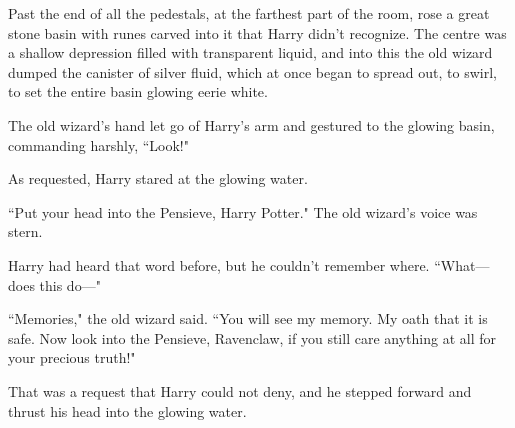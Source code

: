 Past the end of all the pedestals, at the farthest part of the room, rose a great stone basin with runes carved into it that Harry didn't recognize. The centre was a shallow depression filled with transparent liquid, and into this the old wizard dumped the canister of silver fluid, which at once began to spread out, to swirl, to set the entire basin glowing eerie white.

The old wizard's hand let go of Harry's arm and gestured to the glowing basin, commanding harshly, ``Look!"

As requested, Harry stared at the glowing water.

``Put your head into the Pensieve, Harry Potter." The old wizard's voice was stern.

Harry had heard that word before, but he couldn't remember where. ``What—does this do—"

``Memories," the old wizard said. ``You will see my memory. My oath that it is safe. Now look into the Pensieve, Ravenclaw, if you still care anything at all for your precious truth!"

That was a request that Harry could not deny, and he stepped forward and thrust his head into the glowing water.

\later

